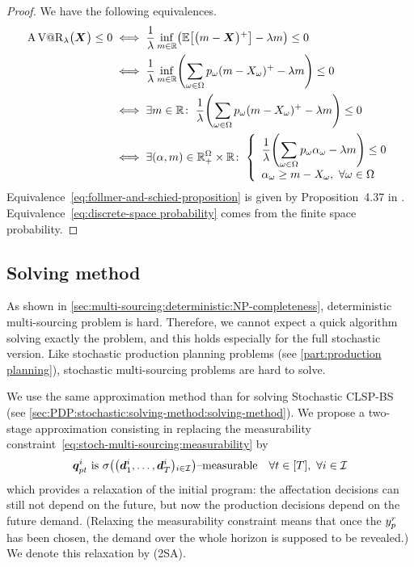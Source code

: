 \begin{proof}
We have the following equivalences.
\begin{subequations}
  \begin{align}
    \ds\AVaR_{\lambda}\bracket{\va X} \le 0 &\ds\iff \frac{1}{\lambda} \inf_{m\in\RR}\bracket{\espe\sqbracket{\bracket{m-\va X}^+}-\lambda m} \le 0
    \label{eq:follmer-and-schied-proposition}
    \\
    &\ds\iff \frac{1}{\lambda} \inf_{m\in\RR}\bracket{\sum_{\omega\in\Omega}p_{\omega}\bracket{m-X_{\omega}}^+ - \lambda m} \le 0
    \label{eq:discrete-space probability}
    \\
    &\ds\iff \exists m\in\RR \colon\; \frac{1}{\lambda}    \bracket{ \sum_{\omega\in\Omega}p_{\omega}\bracket{m-X_{\omega} }^+ - \lambda m} \le 0
    \\
    &\ds\iff \exists \bracket{\alpha,m}\in\RR_+^{\Omega}\times\RR\colon\;
    \left\{
      \begin{array}{l}
        \ds\frac{1}{\lambda}\bracket{\sum_{\omega\in\Omega}p_{\omega}\alpha_{\omega}-\lambda m} \le 0 \\
        \ds\alpha_{\omega}\ge m-X_{\omega},\ \forall\omega\in\Omega
      \end{array}
    \right.
  \end{align}
\end{subequations}
Equivalence~\eqref{eq:follmer-and-schied-proposition} is given by Proposition~4.37 in \cite{Follmer2004}.
Equivalence~\eqref{eq:discrete-space probability} comes from the finite space probability.
\end{proof}


\subsection{Solving method}
\label{sec:multi-sourcing:stochastic:solving-method:solving-method}


As shown in \cref{sec:multi-sourcing:deterministic:NP-completeness}, deterministic multi-sourcing problem is hard.
Therefore, we cannot expect a quick algorithm solving exactly the problem, and this holds especially for the full stochastic version.
Like stochastic production planning problems (see \cref{part:production planning}), stochastic multi-sourcing problems are hard to solve.


We use the same approximation method than for solving Stochastic CLSP-BS (see \cref{sec:PDP:stochastic:solving-method:solving-method}).
We propose a two-stage approximation consisting in replacing the measurability constraint~\eqref{eq:stoch-multi-sourcing:measurability} by
\begin{equation}
\va\quantity_{pt}^i\ \mbox{is}\ \Sfield{\bracket{\va\demand_1^i,\ldots,\va\demand_{\horizon}^i}_{i\in\REF}}\mbox{--measurable} \quad \forall t\in\range{\horizon},\ \forall i\in\REF
\end{equation}
which provides a relaxation of the initial program: the affectation decisions can still not depend on the future, but now the production decisions depend on the future demand.
(Relaxing the measurability constraint means that once the $y_p^r$ has been chosen, the demand over the whole horizon is supposed to be revealed.)
We denote this relaxation by (2SA).


